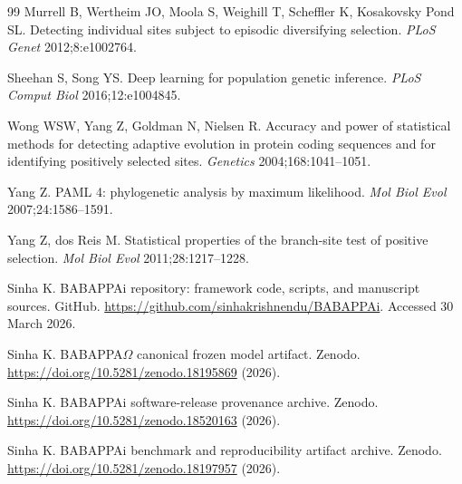 \documentclass[11pt]{article}
\begin{document}
\begin{thebibliography}{99}
Murrell B, Wertheim JO, Moola S, Weighill T, Scheffler K, Kosakovsky Pond SL.
Detecting individual sites subject to episodic diversifying selection.
\emph{PLoS Genet} 2012;8:e1002764.

Sheehan S, Song YS.
Deep learning for population genetic inference.
\emph{PLoS Comput Biol} 2016;12:e1004845.

Wong WSW, Yang Z, Goldman N, Nielsen R.
Accuracy and power of statistical methods for detecting adaptive evolution in protein coding sequences and for identifying positively selected sites.
\emph{Genetics} 2004;168:1041--1051.

Yang Z.
PAML 4: phylogenetic analysis by maximum likelihood.
\emph{Mol Biol Evol} 2007;24:1586--1591.

Yang Z, dos Reis M.
Statistical properties of the branch-site test of positive selection.
\emph{Mol Biol Evol} 2011;28:1217--1228.

Sinha K.
BABAPPAi repository: framework code, scripts, and manuscript sources.
GitHub. \url{https://github.com/sinhakrishnendu/BABAPPAi}. Accessed 30 March 2026.

Sinha K.
BABAPPA$\Omega$ canonical frozen model artifact.
Zenodo. \url{https://doi.org/10.5281/zenodo.18195869} (2026).

Sinha K.
BABAPPAi software-release provenance archive.
Zenodo. \url{https://doi.org/10.5281/zenodo.18520163} (2026).

Sinha K.
BABAPPAi benchmark and reproducibility artifact archive.
Zenodo. \url{https://doi.org/10.5281/zenodo.18197957} (2026).

\end{thebibliography}
\end{document}
